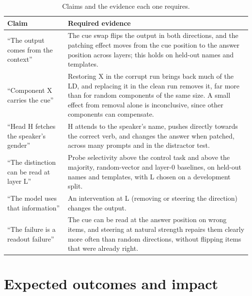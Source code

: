 \documentclass[11pt,a4paper]{article}
\begin{document}
\begin{table}[H]
\centering
\small
\begin{tabularx}{\textwidth}{@{}>{\raggedright\arraybackslash}p{} Y@{}}
\toprule
\textbf{Claim} & \textbf{Required evidence} \\
\midrule
``The output comes from the context'' & The cue swap flips the output in both directions, and the patching effect moves from the cue position to the answer position across layers; this holds on held-out names and templates. \\[2pt]
``Component X carries the cue'' & Restoring X in the corrupt run brings back much of the LD, and replacing it in the clean run removes it, far more than for random components of the same size. A small effect from removal alone is inconclusive, since other components can compensate. \\[2pt]
``Head H fetches the speaker's gender'' & H attends to the speaker's name, pushes directly towards the correct verb, and changes the answer when patched, across many prompts and in the distractor test. \\[2pt]
``The distinction can be read at layer L'' & Probe selectivity above the control task and above the majority, random-vector and layer-0 baselines, on held-out names and templates, with L chosen on a development split. \\[2pt]
``The model uses that information'' & An intervention at L (removing or steering the direction) changes the output. \\[2pt]
``The failure is a readout failure'' & The cue can be read at the answer position on wrong items, and steering at natural strength repairs them clearly more often than random directions, without flipping items that were already right. \\
\bottomrule
\end{tabularx}
\caption{Claims and the evidence each one requires.}
\label{tab:evidence}
\end{table}

\section{Expected outcomes and impact}
\end{document}
